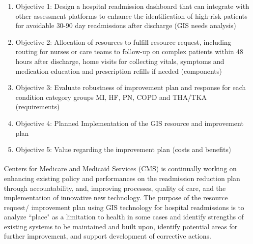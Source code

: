 \documentclass[11pt]{article}\usepackage[]{graphicx}\usepackage[]{color}
\begin{document}
\begin{enumerate}
  \item Objective 1: Design a hospital readmission dashboard that can integrate with other
assessment platforms to enhance the identification of high-risk patients for avoidable 30-90 day readmissions after discharge (GIS needs analysis)
  \item	Objective 2: Allocation of resources to fulfill resource request, including routing for 	
nurses or care teams to follow-up on complex patients within 48 hours after discharge, home visits for collecting vitals, symptoms and medication education and prescription refills if needed (components)
  \item	Objective 3: Evaluate robustness of improvement plan and response for each condition category groups MI, HF, PN, COPD and THA/TKA (requirements)
  \item	Objective 4: Planned Implementation of the GIS resource and improvement plan
  \item	Objective 5: Value regarding the improvement plan (costs and benefits)
\end{enumerate}
\paragraph{}

Centers for Medicare and Medicaid Services (CMS) is continually working on enhancing existing policy and performances on the readmission reduction plan through accountability, and, improving processes, quality of care, and the implementation of innovative new technology. The purpose of the resource request/ improvement plan using GIS technology for hospital readmissions is to analyze ``place" as a limitation to health in some cases and identify strengths of existing systems to be maintained and built upon, identify potential areas for further improvement, and support development of corrective actions.
\end{document}

